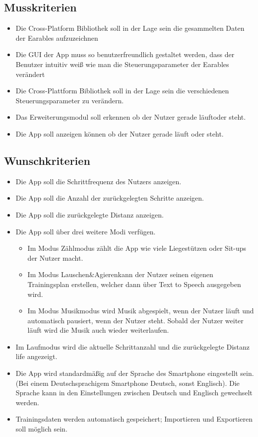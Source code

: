 \documentclass[a4paper,12pt]{article}
\begin{document}
\subsection{Musskriterien}

  \begin{itemize}
    \item Die \Gls{Cross-Platform Bibliothek} soll in der Lage sein die gesammelten Daten der \Gls{Earables} aufzuzeichnen
    \item Die \Gls{GUI} der App muss so benutzerfreundlich gestaltet werden, dass der Benutzer intuitiv weiß wie man die \Gls{Steuerungsparameter} der \Gls{Earables} verändert
    \item Die Cross-Plattform Bibliothek soll in der Lage sein die verschiedenen \Gls{Steuerungsparameter} zu verändern.
    \item Das Erweiterungsmodul soll erkennen ob der Nutzer gerade \glqq läuft\grqq{}oder \glqq steht\grqq.
    \item Die App soll anzeigen können ob der Nutzer gerade läuft oder steht.
  \end{itemize}
\subsection{Wunschkriterien}
  \begin{itemize}
    \item Die App soll die \Gls{Schrittfrequenz} des Nutzers anzeigen.
    \item Die App soll die Anzahl der zurückgelegten Schritte anzeigen.
    \item Die App soll die zurückgelegte Distanz anzeigen.
    \item Die App soll über drei weitere Modi verfügen.
      \begin{itemize}
        \item\text Im Modus \glqq Zählmodus\grqq{} zählt die App wie viele Liegestützen oder Sit-ups der Nutzer macht.
        \item\text  Im Modus \glqq Lauschen\&Agieren\grqq{}kann der Nutzer seinen eigenen Trainingsplan erstellen, welcher dann über Text to Speech ausgegeben wird.
        \item\text  Im Modus \glqq Musikmodus\grqq{} wird Musik abgespielt, wenn der Nutzer läuft und automatisch pausiert, wenn der Nutzer steht. Sobald der Nutzer weiter läuft wird die Musik auch wieder weiterlaufen.
      \end{itemize}
    \item\text Im \glqq Laufmodus \grqq{} wird die aktuelle Schrittanzahl und die zurückgelegte Distanz life angezeigt.
    \item\text Die App wird standardmäßig auf der Sprache des Smartphone eingestellt sein. (Bei einem Deutschsprachigem Smartphone Deutsch, sonst Englisch). Die Sprache kann in den Einstellungen zwischen Deutsch und Englisch gewechselt werden. 
    \item\text Trainingsdaten werden automatisch gespeichert; Importieren und Exportieren soll möglich sein.
  \end{itemize}
\end{document}
